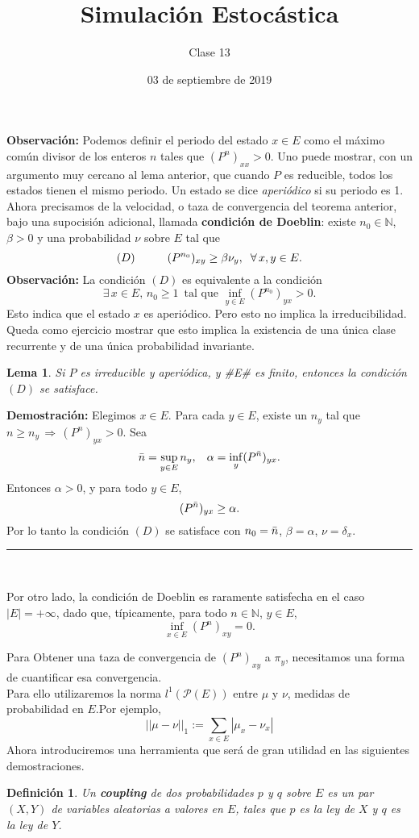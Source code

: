 \documentclass[a4paper]{article}
\title{Simulación Estocástica}
\author{Clase 13}
\date{03 de septiembre de 2019}
\newtheorem{definicion}{Definición}
\newtheorem{lem}{Lema}
\numberwithin{equation}{subsection}
\numberwithin{definicion}{subsection}
\def\N{\mathbb N}
\begin{document}
\maketitle

\textbf{Observación: }Podemos definir el periodo del estado $x\in E$ como el máximo común divisor de los enteros $n$ tales que $(P^n)_{xx}>0$. Uno puede mostrar, con un argumento muy cercano al lema anterior, que cuando $P$ es reducible, todos los estados tienen el mismo periodo. Un estado se dice \textit{aperiódico} si su periodo es 1.\\ \newline
Ahora precisamos de la velocidad, o taza de convergencia del teorema anterior, bajo una supocisión adicional, llamada \textbf{condición de Doeblin}: existe $n_0\in \N$, $\beta>0$ y una probabilidad $\nu$ sobre $E$ tal que
\[(D)\hspace{1cm}(P^{n_0})_{xy}\geq \beta\nu_y,\hspace{0.2cm}\forall\,x,y\in E.\]
\textbf{Observación:} La condición $(D)$ es equivalente a la condición
\[\exists\,x\in E,\,n_0\geq 1\,\text{ tal que }\inf_{y\in E}(P^{n_0})_{yx} > 0.\]
Esto indica que el estado $x$ es aperiódico. Pero esto no implica la irreducibilidad. Queda como ejercicio mostrar que esto implica la existencia de una única clase recurrente y de una única probabilidad invariante.

\begin{lem}
Si $P$ es irreducible y aperiódica, y #E# es finito, entonces la condición $(D)$ se satisface.
\end{lem}

\textbf{Demostración: }Elegimos $x\in E$. Para cada $y\in E$, existe un $n_y$ tal que $n\geq n_y\,\Longrightarrow\, (P^n)_{yx}>0$. Sea
\[\Bar{n} = \sup_{y\in E}n_y,\hspace{0.3cm}\alpha = \inf_y (P^{\Bar{n}})_{yx}.\]
Entonces $\alpha >0$, y para todo $y\in E$,
\[(P^{\Bar{n}})_{yx}\geq \alpha.\]
Por lo tanto la condición $(D)$ se satisface con $n_0 = \Bar{n}$, $\beta=\alpha$, $\nu = \delta_x$.\\
\rule{0.7em}{0.7em}\\ \newline

Por otro lado, la condición de Doeblin es raramente satisfecha en el caso $|E| = +\infty$, dado que, típicamente, para todo $n\in \N$, $y\in E$,
\[\inf_{x\in E}(P^n)_{xy} = 0.\]

Para Obtener una taza de convergencia de $(P^n)_{xy}$ a $\pi_y$, necesitamos una forma de cuantificar esa convergencia.\\ Para ello utilizaremos la norma $l^1(\mathcal{P}(E))$ entre $\mu$ y $\nu$, medidas de probabilidad en $E$.\newline Por ejemplo,
\[||\mu-\nu ||_1 := \sum_{x\in E}|\mu_x - \nu_x|\]
Ahora introduciremos una herramienta que será de gran utilidad en las siguientes demostraciones.
\begin{definicion}
Un \textbf{coupling} de dos probabilidades $p$ y $q$ sobre $E$ es un par $(X,Y)$ de variables aleatorias a valores en $E$, tales que $p$ es la ley de $X$ y $q$ es la ley de $Y$.
\end{definicion}
\end{document}
